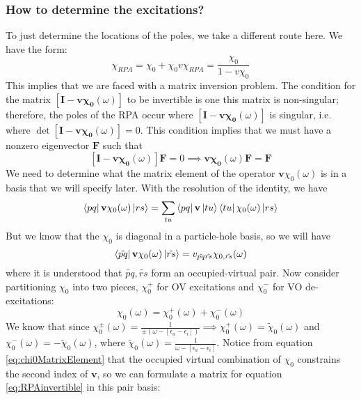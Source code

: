\subsubsection{How to determine the excitations?}
To just determine the locations of the poles, we take a different route here.
We have the form:
\begin{equation}
    \chi_{RPA} = \chi_0 + \chi_0 v \chi_{RPA} = \frac{\chi_0}{1 - v \chi_0}
\end{equation}
This implies that we are faced with a matrix inversion problem. The condition for the matrix $\left[\mathbf{I} - \mathbf{v}\mathbf{\chi_0}(\omega )\right]$ to be invertible is one this matrix is non-singular; therefore, the poles of the RPA occur where $\left[\mathbf{I} - \mathbf{v}\mathbf{\chi_0}(\omega )\right]$ is singular, i.e. where $\det\left[\mathbf{I} - \mathbf{v}\mathbf{\chi_0}(\omega )\right] = 0$. This condition implies that we must have a nonzero eigenvector $\mathbf{F}$ such that
\begin{equation}
    \left[\mathbf{I} - \mathbf{v}\mathbf{\chi_0}(\omega )\right]\mathbf{F} = 0 \implies \mathbf{v}\mathbf{\chi_0}(\omega )\mathbf{F} = \mathbf{F}
\label{eq:RPAinvertible}
\end{equation}
We need to determine what the matrix element of the operator $\mathbf{v}\chi_0(\omega)$ is in a basis that we will specify later. With the resolution of the identity, we have
\begin{equation}
    \bra{pq} \mathbf{v}\chi_0(\omega) \ket{rs} = \sum_{tu} \bra{pq} \mathbf{v} \ket{tu} \bra{tu} \chi_0(\omega) \ket{rs}
\end{equation}
But we know that the $\chi_0$ is diagonal in a particle-hole basis, so we will have
\begin{equation}
    \bra{\tilde{pq}} \mathbf{v}\chi_0(\omega) \ket{\tilde{rs}} = v_{\tilde{pq}\tilde{rs}} \chi_{0,\tilde{rs}}(\omega)
\label{eq:chi0MatrixElement}
\end{equation}
where it is understood that $\tilde{pq}, \tilde{rs}$ form an occupied-virtual pair. Now consider partitioning $\chi_0$ into two pieces, $\chi_0^{+}$ for OV excitations and $\chi_0^{-}$ for VO de-excitations:
\begin{equation}
    \chi_0(\omega) = \chi_{0}^{+}(\omega) + \chi_{0}^{-}(\omega)
\end{equation}
We know that since $\chi_{0}^{\pm}\left(\omega\right) = \frac{1}{\pm \left(\omega - \left[\epsilon_{a}-\epsilon_{i}\right]\right)}\implies \chi_{0}^{+}\left(\omega\right) = \tilde{\chi}_{0}(\omega)$ and $\chi_{0}^{-}\left(\omega\right) = -\tilde{\chi}_{0}(\omega)$, where $\tilde{\chi}_{0}(\omega)= \frac{1}{\omega - \left[\epsilon_{a}-\epsilon_{i}\right]}$. Notice from equation \ref{eq:chi0MatrixElement} that the occupied virtual combination of $\chi_0$ constrains the second index of $\mathbf{v}$, so we can formulate a matrix for equation \ref{eq:RPAinvertible} in this pair basis:
